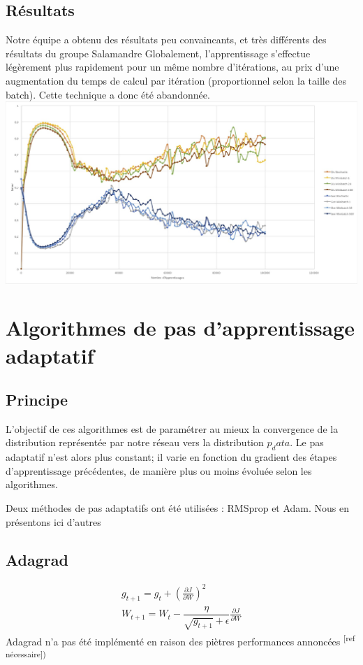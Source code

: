 \subsection{Résultats}
Notre équipe a obtenu des résultats peu convaincants, et très différents des résultats du groupe Salamandre 
Globalement, l'apprentissage s'effectue légèrement plus rapidement pour un même nombre d'itérations, au prix d'une augmentation du temps de calcul par itération (proportionnel selon la taille des batch). Cette technique a donc été abandonnée.
\includegraphics[width=1.5\textwidth]{images/08-gan_ameliorations_resultats_1.jpg}

\section{Algorithmes de pas d'apprentissage adaptatif}
\subsection{Principe}
L'objectif de ces algorithmes est de paramétrer au mieux la convergence de la distribution représentée par notre réseau vers la distribution $p_data$. Le pas adaptatif n'est alors plus constant; il varie en fonction du gradient des étapes d'apprentissage précédentes, de manière plus ou moins évoluée selon les algorithmes.

Deux méthodes de pas adaptatifs ont été utilisées : RMSprop et Adam. Nous en présentons ici d'autres
\subsection{Adagrad}

\begin{equation}
\begin{aligned}
g_{t+1} = g_t + (\frac{\partial J}{\partial W})^2 \\
W_{t+1} = W_t - \dfrac{\eta}{\sqrt{g_{t+1}} + \epsilon}\frac{\partial J}{\partial W}
\end{aligned}
\end{equation} 
Adagrad n'a pas été implémenté en raison des piètres performances annoncées \textsuperscript{[ref nécessaire])}

